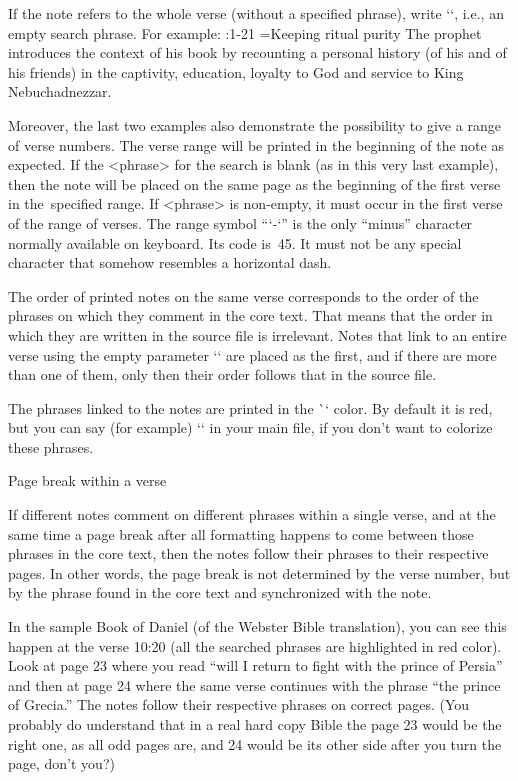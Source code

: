 If the note refers to the whole verse (without a specified phrase), write
`{}`, i.e., an empty search phrase. For example:
\begtt
{}:1-21 {}={Keeping ritual purity}
The prophet introduces the context of his book by recounting a personal history
(of his and of his friends) in the captivity, education, loyalty to God and service 
to King Nebuchadnezzar.
\endtt

Moreover, the last two examples also demonstrate the possibility to give a range of verse numbers.
The verse range will be printed in the beginning of the note as expected.
If the <phrase> for the search is blank (as in this very last example), then the note
will be placed on the same page as the beginning of the first verse in the~specified range.
If <phrase> is non-empty, it must occur in the first verse of the range of verses. 
The range symbol “`-`” is the only “minus” character normally available on
keyboard. Its code is~45. It must not be any special character that somehow resembles a horizontal 
dash.


The order of printed notes on the same verse corresponds to the order of the phrases on which
they comment in the core text. That means that the order in which they are written 
in the source file is irrelevant. Notes that link to an entire verse using the empty parameter `{}`  are placed as the first, and if there are more than one of them, only then their order follows that in the source file.

The phrases linked to the notes are printed in the \`\notecolor` color. By default it is red, but you can say (for example) `\let\notecolor=\relax` in your main file, if you don't want to colorize these phrases.


 Page break within a verse  

If different notes comment on different phrases within a single verse, and at the same time a page break after all formatting happens to come between those phrases in the core text, then the notes follow their phrases to their respective pages. In other words, the page break is not determined by the verse number, but by the phrase found  in the core text and synchronized with the note. 

In the sample Book of Daniel (of the Webster Bible translation), you can see this happen at the verse 10:20 
(all the searched phrases are highlighted in red color). Look at page 23
where you read “will I return to fight with the prince of Persia” and then at page 24 where the same verse continues with the phrase “the prince of Grecia.” The notes follow their respective phrases on correct pages. 
(You probably do understand that in a real hard copy Bible the page 23 would be the right one, as all odd pages are, and 24 would be its other side after you turn the page, don't you?)


